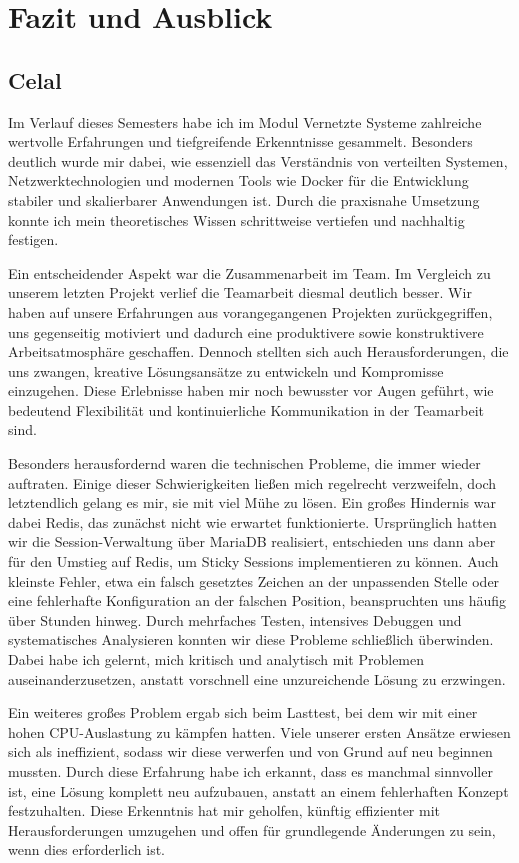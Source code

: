 \section{Fazit und Ausblick}
\subsection{Celal}
Im Verlauf dieses Semesters habe ich im Modul Vernetzte Systeme zahlreiche wertvolle Erfahrungen und tiefgreifende Erkenntnisse gesammelt. Besonders deutlich wurde mir dabei, wie essenziell das Verständnis von verteilten Systemen, Netzwerktechnologien und modernen Tools wie Docker für die Entwicklung stabiler und skalierbarer Anwendungen ist. Durch die praxisnahe Umsetzung konnte ich mein theoretisches Wissen schrittweise vertiefen und nachhaltig festigen.

Ein entscheidender Aspekt war die Zusammenarbeit im Team. Im Vergleich zu unserem letzten Projekt verlief die Teamarbeit diesmal deutlich besser. Wir haben auf unsere Erfahrungen aus vorangegangenen Projekten zurückgegriffen, uns gegenseitig motiviert und dadurch eine produktivere sowie konstruktivere Arbeitsatmosphäre geschaffen. Dennoch stellten sich auch Herausforderungen, die uns zwangen, kreative Lösungsansätze zu entwickeln und Kompromisse einzugehen. Diese Erlebnisse haben mir noch bewusster vor Augen geführt, wie bedeutend Flexibilität und kontinuierliche Kommunikation in der Teamarbeit sind.

Besonders herausfordernd waren die technischen Probleme, die immer wieder auftraten. Einige dieser Schwierigkeiten ließen mich regelrecht verzweifeln, doch letztendlich gelang es mir, sie mit viel Mühe zu lösen. Ein großes Hindernis war dabei Redis, das zunächst nicht wie erwartet funktionierte. Ursprünglich hatten wir die Session-Verwaltung über MariaDB realisiert, entschieden uns dann aber für den Umstieg auf Redis, um Sticky Sessions implementieren zu können. Auch kleinste Fehler, etwa ein falsch gesetztes Zeichen an der unpassenden Stelle oder eine fehlerhafte Konfiguration an der falschen Position, beanspruchten uns häufig über Stunden hinweg. Durch mehrfaches Testen, intensives Debuggen und systematisches Analysieren konnten wir diese Probleme schließlich überwinden. Dabei habe ich gelernt, mich kritisch und analytisch mit Problemen auseinanderzusetzen, anstatt vorschnell eine unzureichende Lösung zu erzwingen.

Ein weiteres großes Problem ergab sich beim Lasttest, bei dem wir mit einer hohen CPU-Auslastung zu kämpfen hatten. Viele unserer ersten Ansätze erwiesen sich als ineffizient, sodass wir diese verwerfen und von Grund auf neu beginnen mussten. Durch diese Erfahrung habe ich erkannt, dass es manchmal sinnvoller ist, eine Lösung komplett neu aufzubauen, anstatt an einem fehlerhaften Konzept festzuhalten. Diese Erkenntnis hat mir geholfen, künftig effizienter mit Herausforderungen umzugehen und offen für grundlegende Änderungen zu sein, wenn dies erforderlich ist.

